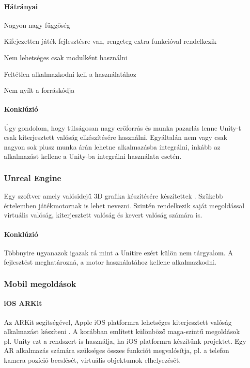 \documentclass[12pt,a4paper,oneside]{report} %
\begin{document}
\paragraph{Hátrányai} 
\begin{compactitem}
	\item Nagyon nagy függőség
	\item Kifejezetten játék fejlesztésre van, rengeteg extra funkcióval rendelkezik
	\item Nem lehetséges csak modulként használni
	\item Feltétlen alkalmazkodni kell a használatához
	\item Nem nyílt a forráskódja
\end{compactitem}
\paragraph{Konklúzió}
Úgy gondolom, hogy túlságosan nagy erőforrás és munka pazarlás lenne Unity-t csak kiterjesztett valóság elkészítésére használni. Egyáltalán nem vagy csak nagyon sok plusz munka árán lehetne alkalmazásba integrálni, inkább az alkalmazást kellene a Unity-ba integrálni használata esetén.

\subsubsection{Unreal Engine}
Egy szoftver amely valósidejű 3D grafika készítésére készítettek \cite{unrealengine}. Szűkebb értelemben játékmotornak is lehet  nevezni. Szintén rendelkezik saját megoldással virtuális valóság, kiterjesztett valóság és kevert valóság számára is.
\paragraph{Konklúzió} Többnyire ugyanazok igazak rá mint a Unitire ezért külön nem tárgyalom. A fejlesztést meghatározná, a motor használatához kellene alkalmazkodni.
\subsubsection{Mobil megoldások}
\paragraph{iOS ARKit}
Az ARKit segítségével, Apple iOS platformra lehetséges kiterjesztett valóság alkalmazást készíteni \cite{arkit}. A korábban említett különböző maga-szintű megoldások pl. Unity ezt a rendszert is használja, ha iOS platformra készítünk projektet. Egy AR alkalmazás számára szükséges összes funkciót megvalósítja, pl. a telefon kamera pozíció becslését, virtuális objektumok elhelyezését.
\end{document}
